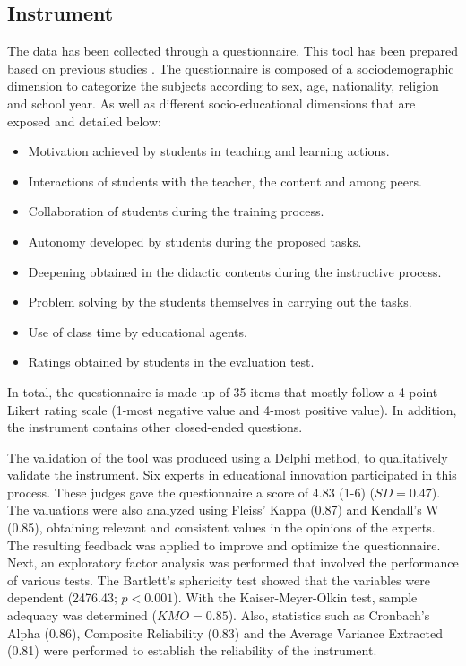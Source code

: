 \documentclass[english]{textolivre}
\begin{document}
\subsection{Instrument}
The data has been collected through a questionnaire. This tool has been prepared based on previous studies \cite{pozosanchez-lopezbelmonte-morenoguerrero-hijonolucena2020}. %
The questionnaire is composed of a sociodemographic dimension to categorize the subjects according to sex, age, nationality, religion and school year. As well as different socio-educational dimensions that are exposed and detailed below:

\begin{itemize}
    \item Motivation achieved by students in teaching and learning actions.
    \item Interactions of students with the teacher, the content and among peers.
    \item Collaboration of students during the training process.
    \item Autonomy developed by students during the proposed tasks.
    \item Deepening obtained in the didactic contents during the instructive process.
    \item Problem solving by the students themselves in carrying out the tasks.
    \item Use of class time by educational agents.
    \item Ratings obtained by students in the evaluation test.
\end{itemize}

In total, the questionnaire is made up of 35 items that mostly follow a 4-point Likert rating scale (1-most negative value and 4-most positive value). In addition, the instrument contains other closed-ended questions.

The validation of the tool was produced using a Delphi method, to qualitatively validate the instrument. Six experts in educational innovation participated in this process. These judges gave the questionnaire a score of 4.83 (1-6) ($SD = 0.47$). The valuations were also analyzed using Fleiss' Kappa (0.87) and Kendall's W (0.85), obtaining relevant and consistent values in the opinions of the experts. The resulting feedback was applied to improve and optimize the questionnaire. Next, an exploratory factor analysis was performed that involved the performance of various tests. The Bartlett's sphericity test showed that the variables were dependent (2476.43; $p<0.001$). With the Kaiser-Meyer-Olkin test, sample adequacy was determined ($KMO = 0.85$). Also, statistics such as Cronbach's Alpha (0.86), Composite Reliability (0.83) and the Average Variance Extracted (0.81) were performed to establish the reliability of the instrument.
\end{document}
